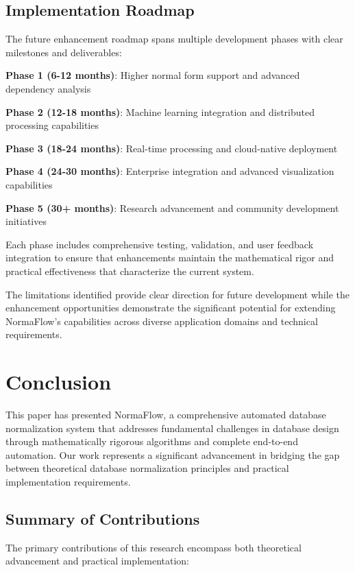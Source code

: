 \documentclass[acmsmall]{acmart}
\begin{document}
\subsection{Implementation Roadmap}

The future enhancement roadmap spans multiple development phases with clear milestones and deliverables:

\textbf{Phase 1 (6-12 months)}: Higher normal form support and advanced dependency analysis

\textbf{Phase 2 (12-18 months)}: Machine learning integration and distributed processing capabilities  

\textbf{Phase 3 (18-24 months)}: Real-time processing and cloud-native deployment

\textbf{Phase 4 (24-30 months)}: Enterprise integration and advanced visualization capabilities

\textbf{Phase 5 (30+ months)}: Research advancement and community development initiatives

Each phase includes comprehensive testing, validation, and user feedback integration to ensure that enhancements maintain the mathematical rigor and practical effectiveness that characterize the current system.

The limitations identified provide clear direction for future development while the enhancement opportunities demonstrate the significant potential for extending NormaFlow's capabilities across diverse application domains and technical requirements.

\section{Conclusion}

This paper has presented NormaFlow, a comprehensive automated database normalization system that addresses fundamental challenges in database design through mathematically rigorous algorithms and complete end-to-end automation. Our work represents a significant advancement in bridging the gap between theoretical database normalization principles and practical implementation requirements.

\subsection{Summary of Contributions}

The primary contributions of this research encompass both theoretical advancement and practical implementation:
\end{document}

